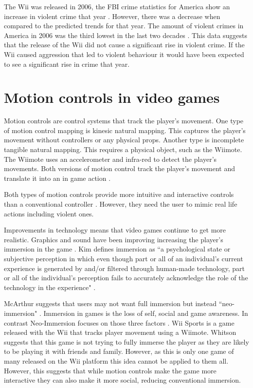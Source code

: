 \documentclass{scrartcl}
\begin{document}
The Wii was released in 2006, the FBI crime statistics for America show an increase in violent crime that year \cite{FBI}.  However, there was a decrease when compared to the predicted trends for that year. The amount of violent crimes in America in 2006 was the third lowest in the last two decades \cite{FBIArchives}. This data suggests that the release of the Wii did not cause a significant rise in violent crime. If the Wii caused aggression that led to violent behaviour it would  have been expected to see a significant rise in crime that year.


\section{Motion controls in video games}
Motion controls are control systems that track the player's movement. One type of motion control mapping is kinesic natural mapping. This captures the player's movement without controllers or any physical props. Another type is incomplete tangible natural mapping. This requires a physical object, such as the Wiimote. The Wiimote uses an accelerometer and infra-red to detect the player's movements. Both versions of motion control track the player's movement and translate it into an in game action \cite{McEwan2012}.

Both types of motion controls provide more intuitive and interactive controls than a conventional controller \cite{Kim}.  However, they need the user to mimic real life actions including violent ones. 

\bigskip
Improvements in technology means that video games continue to get more realistic. Graphics and sound have been improving increasing the player's immersion in the game \cite{Kim}.
Kim defines immersion as ``a psychological state or subjective perception in which even though part or all of an   individual’s   current   experience is generated by and/or filtered through human-made technology, part or all of the individual’s perception fails to accurately acknowledge the role of the technology in the experience" \cite{Kim}.

\bigskip
McArthur suggests that users may not want full immersion but instead ``neo-immersion" \cite{McArthur}. Immersion in games is the loss of self, social and game awareness. In contrast Neo-Immersion focuses on those three factors \cite{Whitson}. Wii Sports is a game released with the Wii that tracks player movement using a Wiimote. Whitson suggests that this game is not trying to fully immerse the player as they are likely to be playing it with friends and family. However, as this is only one game of many released on the Wii platform this idea cannot be applied to them all. However, this suggests that while motion controls make the game more interactive they can also make it more social, reducing conventional immersion.
\end{document}
